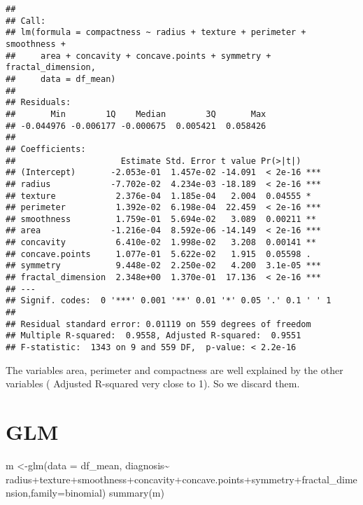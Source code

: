 \documentclass[
  11pt,
]{article}
\newenvironment{Shaded}{\begin{snugshade}}{\end{snugshade}}
\newcommand{\AttributeTok}[1]{\textcolor[rgb]{0.77,0.63,0.00}{#1}}
\newcommand{\FunctionTok}[1]{\textcolor[rgb]{0.00,0.00,0.00}{#1}}
\newcommand{\NormalTok}[1]{#1}
\newcommand{\OtherTok}[1]{\textcolor[rgb]{0.56,0.35,0.01}{#1}}
\newcommand{\SpecialCharTok}[1]{\textcolor[rgb]{0.00,0.00,0.00}{#1}}
\begin{document}
\begin{verbatim}
## 
## Call:
## lm(formula = compactness ~ radius + texture + perimeter + smoothness + 
##     area + concavity + concave.points + symmetry + fractal_dimension, 
##     data = df_mean)
## 
## Residuals:
##       Min        1Q    Median        3Q       Max 
## -0.044976 -0.006177 -0.000675  0.005421  0.058426 
## 
## Coefficients:
##                     Estimate Std. Error t value Pr(>|t|)    
## (Intercept)       -2.053e-01  1.457e-02 -14.091  < 2e-16 ***
## radius            -7.702e-02  4.234e-03 -18.189  < 2e-16 ***
## texture            2.376e-04  1.185e-04   2.004  0.04555 *  
## perimeter          1.392e-02  6.198e-04  22.459  < 2e-16 ***
## smoothness         1.759e-01  5.694e-02   3.089  0.00211 ** 
## area              -1.216e-04  8.592e-06 -14.149  < 2e-16 ***
## concavity          6.410e-02  1.998e-02   3.208  0.00141 ** 
## concave.points     1.077e-01  5.622e-02   1.915  0.05598 .  
## symmetry           9.448e-02  2.250e-02   4.200  3.1e-05 ***
## fractal_dimension  2.348e+00  1.370e-01  17.136  < 2e-16 ***
## ---
## Signif. codes:  0 '***' 0.001 '**' 0.01 '*' 0.05 '.' 0.1 ' ' 1
## 
## Residual standard error: 0.01119 on 559 degrees of freedom
## Multiple R-squared:  0.9558, Adjusted R-squared:  0.9551 
## F-statistic:  1343 on 9 and 559 DF,  p-value: < 2.2e-16
\end{verbatim}

The variables area, perimeter and compactness are well explained by the
other variables ( Adjusted R-squared very close to 1). So we discard
them.

\hypertarget{glm}{%
\section{GLM}\label{glm}}

\begin{Shaded}
\begin{Highlighting}[]
\NormalTok{m }\OtherTok{\textless{}{-}}\FunctionTok{glm}\NormalTok{(}\AttributeTok{data =}\NormalTok{ df\_mean, diagnosis}\SpecialCharTok{\textasciitilde{}}\NormalTok{ radius}\SpecialCharTok{+}\NormalTok{texture}\SpecialCharTok{+}\NormalTok{smoothness}\SpecialCharTok{+}\NormalTok{concavity}\SpecialCharTok{+}\NormalTok{concave.points}\SpecialCharTok{+}\NormalTok{symmetry}\SpecialCharTok{+}\NormalTok{fractal\_dimension,}\AttributeTok{family=}\NormalTok{binomial)}
\FunctionTok{summary}\NormalTok{(m)}
\end{Highlighting}
\end{Shaded}
\end{document}
